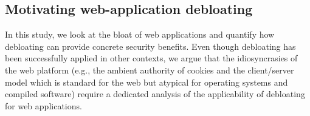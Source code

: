\subsection{Motivating web-application debloating}

In this study, we look at the bloat of web applications and quantify how
debloating can provide concrete security benefits. Even
though debloating has been successfully applied in other contexts, we argue
that the
idiosyncrasies of the web platform (e.g., the ambient authority of cookies and
the client/server model which is standard for the web but atypical
for operating systems and compiled software) require a dedicated analysis
of the applicability of debloating for web applications.




